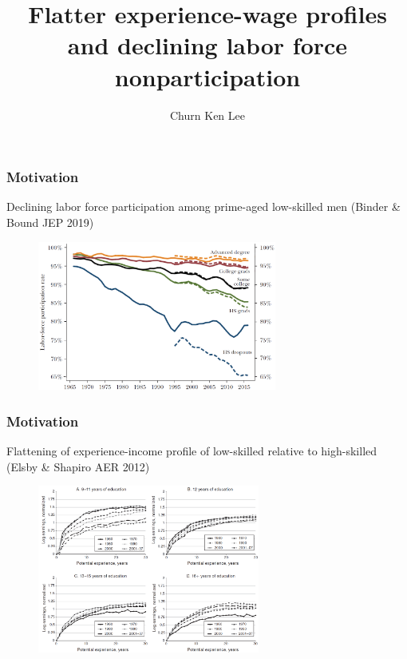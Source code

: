 \documentclass[aspectratio=169]{beamer}
\title{Flatter experience-wage profiles and declining labor force nonparticipation}
\author{Churn Ken Lee}
\institute{UC San Diego}
\date{}
\begin{document}
\frame{\titlepage}

\begin{frame}
    \frametitle{Motivation}

    Declining labor force participation among prime-aged low-skilled men (Binder \& Bound JEP 2019)
    \begin{figure}[t]
        \includegraphics[width=0.7\textwidth]{../output/participation_education.png}
        \centering
    \end{figure}

\end{frame}

\begin{frame}
    \frametitle{Motivation}

    Flattening of experience-income profile of low-skilled relative to high-skilled (Elsby \& Shapiro AER 2012)
    \begin{figure}[t]
        \includegraphics[width=0.65\textwidth]{../output/profile_cross_elsby_shapiro.png}
        \centering
    \end{figure}
\end{frame}
\end{document}
